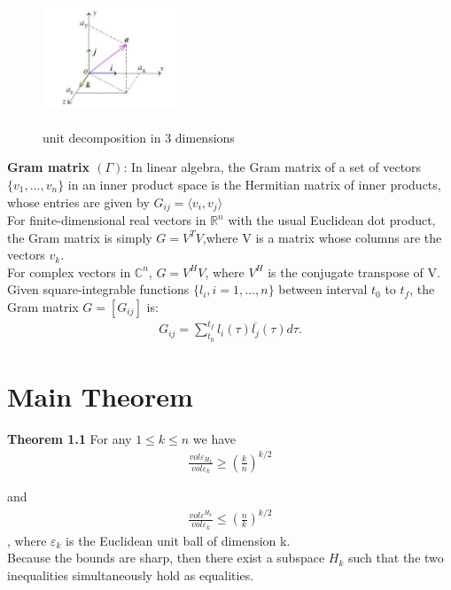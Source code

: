 \documentclass[fontsize=12pt,a4paper]{article}
\begin{document}
\begin{figure}[!htb]
\centering
  \includegraphics[width=4cm,height = 4cm]{unit-d.png}
  \caption{unit decomposition in 3 dimensions}
\end{figure}

\textbf{Gram matrix $(\Gamma)$}: In linear algebra, the Gram matrix of a set of vectors $\{v_1,...,v_n\}$ in an inner product space is the Hermitian matrix of inner products, whose entries are given by $G_{ij} = \langle v_i,v_j \rangle $\\
For finite-dimensional real vectors in $\mathbb{R}^n$ with the usual Euclidean dot product, the Gram matrix is simply $G = V^T V$,where V is a matrix whose columns are the vectors $v_k$. \\
For complex vectors in $\mathbb{C}^n$, $G = V^H V$, where $V^H$ is the conjugate transpose of V.
Given square-integrable functions $\{l_i,i = 1,...,n\}$ between interval $t_0$ to $t_f$, the Gram matrix $G = [G_{ij}]$ is:
\begin{align}
    G_{ij} = \sum_{t_0}^{t_f} l_i(\tau)\overline{l_j}(\tau) d\tau.
\end{align}

\section{Main Theorem}
\textbf{Theorem 1.1} For any $1\leq k \leq n$ we have\\
\begin{align}
    \frac{vol \varepsilon_H_k}{vol \varepsilon_k}\geq (\frac{k}{n})^{k/2}
\end{align}

and
\begin{align}
      \frac{vol \varepsilon^{H_k}}{vol \varepsilon_k}\leq (\frac{n}{k})^{k/2}
\end{align}
, where $\varepsilon_k$ is the Euclidean unit ball of dimension k.\\
Because the bounds are sharp, then there exist a subspace $H_k$ such that the two inequalities simultaneously hold as equalities.\\
\end{document}
